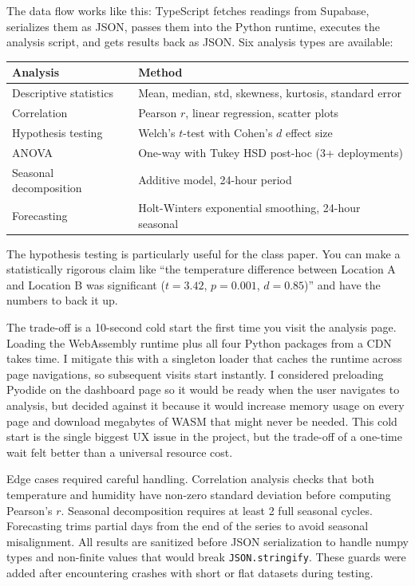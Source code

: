 \documentclass[11pt, letterpaper]{article}
\begin{document}
The data flow works like this: TypeScript fetches readings from Supabase, serializes them as JSON, passes them into the Python runtime, executes the analysis script, and gets results back as JSON. Six analysis types are available:

\begin{table}[H]
\centering\sffamily\small
\begin{tabularx}{\textwidth}{@{}lX@{}}
\toprule
\textbf{Analysis} & \textbf{Method} \\
\midrule
Descriptive statistics & Mean, median, std, skewness, kurtosis, standard error \\
Correlation & Pearson $r$, linear regression, scatter plots \\
Hypothesis testing & Welch's $t$-test with Cohen's $d$ effect size \\
ANOVA & One-way with Tukey HSD post-hoc (3+ deployments) \\
Seasonal decomposition & Additive model, 24-hour period \\
Forecasting & Holt-Winters exponential smoothing, 24-hour seasonal \\
\bottomrule
\end{tabularx}
\end{table}

The hypothesis testing is particularly useful for the class paper. You can make a statistically rigorous claim like ``the temperature difference between Location A and Location B was significant ($t=3.42$, $p=0.001$, $d=0.85$)'' and have the numbers to back it up.

The trade-off is a 10-second cold start the first time you visit the analysis page. Loading the WebAssembly runtime plus all four Python packages from a CDN takes time. I mitigate this with a singleton loader that caches the runtime across page navigations, so subsequent visits start instantly. I considered preloading Pyodide on the dashboard page so it would be ready when the user navigates to analysis, but decided against it because it would increase memory usage on every page and download megabytes of WASM that might never be needed. This cold start is the single biggest UX issue in the project, but the trade-off of a one-time wait felt better than a universal resource cost.

Edge cases required careful handling. Correlation analysis checks that both temperature and humidity have non-zero standard deviation before computing Pearson's $r$. Seasonal decomposition requires at least 2 full seasonal cycles. Forecasting trims partial days from the end of the series to avoid seasonal misalignment. All results are sanitized before JSON serialization to handle numpy types and non-finite values that would break \texttt{JSON.stringify}. These guards were added after encountering crashes with short or flat datasets during testing.
\end{document}
